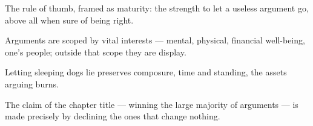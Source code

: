 

\begin{distilled}
  \item The rule of thumb, framed as maturity: the strength to let a useless argument go, above all when sure of being right.
  \item Arguments are scoped by vital interests --- mental, physical, financial well-being, one's people; outside that scope they are display.
  \item Letting sleeping dogs lie preserves composure, time and standing, the assets arguing burns.
  \item The claim of the chapter title --- winning the large majority of arguments --- is made precisely by declining the ones that change nothing.
\end{distilled}
